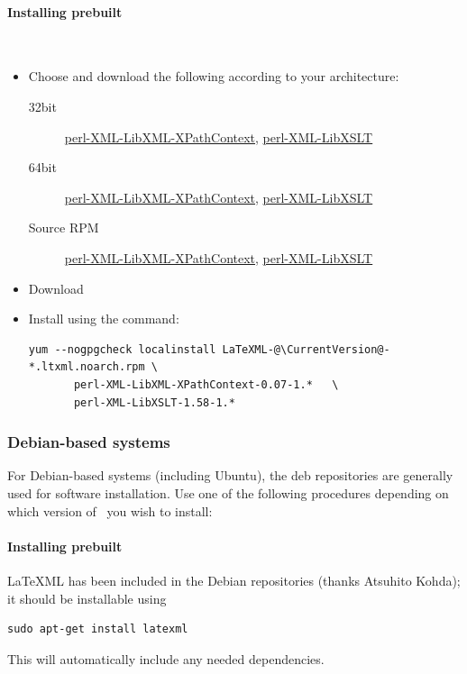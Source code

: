 \documentclass{article}
\begin{document}
\paragraph{Installing prebuilt}\\
\begin{itemize}
\item Choose and download the following according to your architecture:
\begin{description}
\item[32bit]
   \href{releases/perl-XML-LibXML-XPathContext-0.07-1.c5.ltxml.i386.rpm}{perl-XML-LibXML-XPathContext},
   \href{releases/perl-XML-LibXSLT-1.58-1.c5.ltxml.i386.rpm}{perl-XML-LibXSLT}
\item[64bit]
   \href{releases/perl-XML-LibXML-XPathContext-0.07-1.c5.ltxml.x86_64.rpm}{perl-XML-LibXML-XPathContext},
   \href{releases/perl-XML-LibXSLT-1.58-1.c5.ltxml.x86_64.rpm}{perl-XML-LibXSLT}
\item[Source RPM]
    \href{releases/perl-XML-LibXML-XPathContext-0.07-1.c5.ltxml.src.rpm}{perl-XML-LibXML-XPathContext},
    \href{releases/perl-XML-LibXSLT-1.58-1.c5.ltxml.src.rpm}{perl-XML-LibXSLT}
\end{description}
\item Download \CurrentCentos
\item Install using the command:
\begin{lstlisting}[style=shell]
   yum --nogpgcheck localinstall LaTeXML-@\CurrentVersion@-*.ltxml.noarch.rpm \
       perl-XML-LibXML-XPathContext-0.07-1.*   \
       perl-XML-LibXSLT-1.58-1.*
\end{lstlisting}
\end{itemize}

\subsubsection{Debian-based systems}\label{install.debian}
For Debian-based systems (including Ubuntu), the deb repositories
are generally used for software installation.
Use one of the following procedures depending on which version
of \LaTeXML\ you wish to install:
\paragraph{Installing prebuilt}
LaTeXML has been included in the Debian repositories (thanks Atsuhito Kohda);
it should be installable using
\begin{lstlisting}[style=shell]
  sudo apt-get install latexml
\end{lstlisting}
This will automatically include any needed dependencies.
\end{document}
